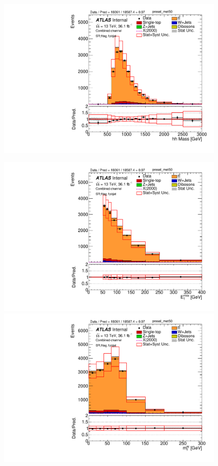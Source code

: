 \begin{figure}[!htbp]
\begin{center}
\includegraphics[scale=0.33]{./figures/boosted/Plot1tag1pbjet/DataMC_1tag_1pbjet_SR_lepton_presel_met50_hhMassRebin1}\\
\par\medskip
\includegraphics[scale=0.33]{./figures/boosted/Plot1tag1pbjet/DataMC_1tag_1pbjet_SR_lepton_presel_met50_MET}
\includegraphics[scale=0.33]{./figures/boosted/Plot1tag1pbjet/DataMC_1tag_1pbjet_SR_lepton_presel_met50_WlepMtATLAS}

\end{center}
\end{figure}
